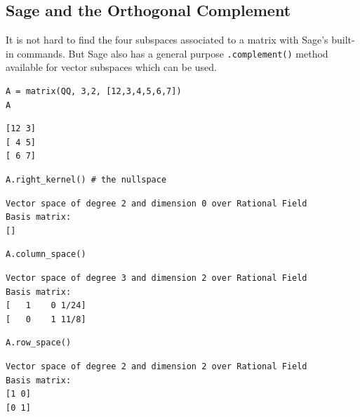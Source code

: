 \documentclass[10pt,]{book}
\theoremstyle{plain}
\theoremstyle{definition}
\numberwithin{equation}{section}
\begin{document}
\subsection[Sage and the Orthogonal Complement]{Sage and the Orthogonal Complement}\label{subsection-95}

      It is not hard to find the four subspaces associated to a matrix with Sage's
      built-in commands. But Sage also has a general purpose \verb?.complement()?
      method available for vector subspaces which can be used.
\begin{lstlisting}[style=sageinput]
A = matrix(QQ, 3,2, [12,3,4,5,6,7])
A
\end{lstlisting}
\begin{lstlisting}[style=sageoutput]
[12 3]
[ 4 5]
[ 6 7]
\end{lstlisting}
\begin{lstlisting}[style=sageinput]
A.right_kernel() # the nullspace
\end{lstlisting}
\begin{lstlisting}[style=sageoutput]
Vector space of degree 2 and dimension 0 over Rational Field
Basis matrix:
[]
\end{lstlisting}
\begin{lstlisting}[style=sageinput]
A.column_space()
\end{lstlisting}
\begin{lstlisting}[style=sageoutput]
Vector space of degree 3 and dimension 2 over Rational Field
Basis matrix:
[   1    0 1/24]
[   0    1 11/8]
\end{lstlisting}
\begin{lstlisting}[style=sageinput]
A.row_space()
\end{lstlisting}
\begin{lstlisting}[style=sageoutput]
Vector space of degree 2 and dimension 2 over Rational Field
Basis matrix:
[1 0]
[0 1]
\end{lstlisting}
\par
\end{document}
